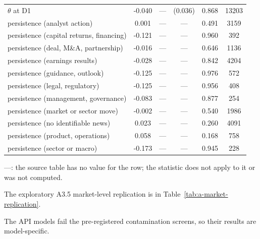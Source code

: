 \begin{table}[htbp]
\begin{threeparttable}
\begin{tabular}{@{}lS[table-format=-1.3]S[table-format=1.3]S[table-format=1.3, table-space-text-pre=(, table-space-text-post=)]S[table-format=1.3]S[table-format=5.0]@{}}
$\theta$ at D1 & -0.040 & {---} & {(}0.036{)} & 0.868 & 13203 \\
persistence (analyst action) & 0.001 & {---} & {---} & 0.491 & 3159 \\
persistence (capital returns, financing) & -0.121 & {---} & {---} & 0.960 & 392 \\
persistence (deal, M\&A, partnership) & -0.016 & {---} & {---} & 0.646 & 1136 \\
persistence (earnings results) & -0.028 & {---} & {---} & 0.842 & 4204 \\
persistence (guidance, outlook) & -0.125 & {---} & {---} & 0.976 & 572 \\
persistence (legal, regulatory) & -0.125 & {---} & {---} & 0.956 & 408 \\
persistence (management, governance) & -0.083 & {---} & {---} & 0.877 & 254 \\
persistence (market or sector move) & -0.002 & {---} & {---} & 0.540 & 1986 \\
persistence (no identifiable news) & 0.023 & {---} & {---} & 0.260 & 4091 \\
persistence (product, operations) & 0.058 & {---} & {---} & 0.168 & 758 \\
persistence (sector or macro) & -0.173 & {---} & {---} & 0.945 & 228 \\
\bottomrule
\end{tabular}
\begin{tablenotes}[flushleft]\footnotesize
\item ---: the source table has no value for the row; the statistic does not apply to it or was not computed.
\item The exploratory A3.5 market-level replication is in Table~\ref{tab:a-market-replication}.
\item The API models fail the pre-registered contamination screens, so their results are model-specific.
\end{tablenotes}
\end{threeparttable}
\end{table}
